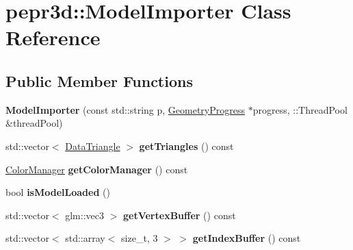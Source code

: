 \hypertarget{classpepr3d_1_1_model_importer}{}\section{pepr3d\+::Model\+Importer Class Reference}
\label{classpepr3d_1_1_model_importer}
\subsection*{Public Member Functions}
\begin{DoxyCompactItemize}
\item 
\mbox{\label{classpepr3d_1_1_model_importer_ae34f94fa256e598818039431f49f8709}} 
{\bfseries Model\+Importer} (const std\+::string p, \mbox{\hyperlink{structpepr3d_1_1_geometry_progress}{Geometry\+Progress}} $\ast$progress, \+::Thread\+Pool \&thread\+Pool)
\item 
\mbox{\label{classpepr3d_1_1_model_importer_aca674c511db529638e83ade8aad83e24}} 
std\+::vector$<$ \mbox{\hyperlink{classpepr3d_1_1_data_triangle}{Data\+Triangle}} $>$ {\bfseries get\+Triangles} () const
\item 
\mbox{\label{classpepr3d_1_1_model_importer_aa3ba28412e9317aff4850ccd251e721e}} 
\mbox{\hyperlink{classpepr3d_1_1_color_manager}{Color\+Manager}} {\bfseries get\+Color\+Manager} () const
\item 
\mbox{\label{classpepr3d_1_1_model_importer_a49b8a0fd779eedce1cf24a910fcce833}} 
bool {\bfseries is\+Model\+Loaded} ()
\item 
\mbox{\label{classpepr3d_1_1_model_importer_a8b27edc2cd72882c9144ff870ee26a6b}} 
std\+::vector$<$ glm\+::vec3 $>$ {\bfseries get\+Vertex\+Buffer} () const
\item 
\mbox{\label{classpepr3d_1_1_model_importer_a0d21b9019f26f672414ad0bb40bb946c}} 
std\+::vector$<$ std\+::array$<$ size\+\_\+t, 3 $>$ $>$ {\bfseries get\+Index\+Buffer} () const
\end{DoxyCompactItemize}
